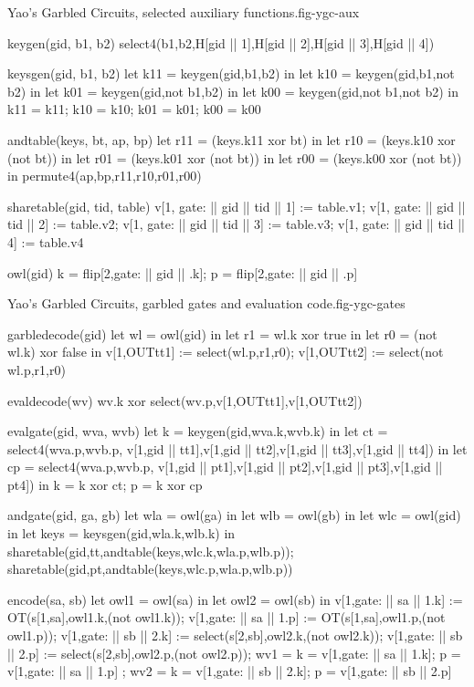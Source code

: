 \begin{fpfig}[t]{Yao's Garbled Circuits, selected auxiliary functions.}{fig-ygc-aux}
{\footnotesize
\begin{verbatimtab}
  keygen(gid, b1, b2) { select4(b1,b2,H[gid || 1],H[gid || 2],H[gid || 3],H[gid || 4]) }
  
  keysgen(gid, b1, b2)
  {
    let k11 = keygen(gid,b1,b2) in
    let k10 = keygen(gid,b1,not b2) in
    let k01 = keygen(gid,not b1,b2) in
    let k00 = keygen(gid,not b1,not b2) in
    {k11 = k11; k10 = k10; k01 = k01; k00 = k00}
  }
  
  andtable(keys, bt, ap, bp)
  {
    let r11 = (keys.k11 xor bt) in 
    let r10 = (keys.k10 xor (not bt)) in
    let r01 = (keys.k01 xor (not bt)) in
    let r00 = (keys.k00 xor (not bt)) in
    permute4(ap,bp,r11,r10,r01,r00)
  }
  
  sharetable(gid, tid, table)
  {   
    v[1, gate: || gid || tid || 1] := table.v1;
    v[1, gate: || gid || tid || 2] := table.v2;
    v[1, gate: || gid || tid || 3] := table.v3;
    v[1, gate: || gid || tid || 4] := table.v4
  }

  owl(gid) {  { k = flip[2,gate: || gid || .k]; p = flip[2,gate: || gid || .p] }  }
\end{verbatimtab}
}
\end{fpfig}

\begin{fpfig}[t]{Yao's Garbled Circuits, garbled gates and evaluation code.}{fig-ygc-gates}
{\footnotesize
\begin{verbatimtab}
  garbledecode(gid)    
  {
    let wl = owl(gid) in
    let r1 = wl.k xor true in
    let r0 = (not wl.k) xor false in
    v[1,OUTtt1] := select(wl.p,r1,r0);
    v[1,OUTtt2] := select(not wl.p,r1,r0)
  }
  
  evaldecode(wv) { wv.k xor select(wv.p,v[1,OUTtt1],v[1,OUTtt2]) }
  
  evalgate(gid, wva, wvb)  
  {
    let k = keygen(gid,wva.k,wvb.k) in
    let ct = select4(wva.p,wvb.p,
               v[1,gid || tt1],v[1,gid || tt2],v[1,gid || tt3],v[1,gid || tt4]) in
    let cp = select4(wva.p,wvb.p,
               v[1,gid || pt1],v[1,gid || pt2],v[1,gid || pt3],v[1,gid || pt4]) in
    { k = k xor ct; p = k xor cp }
  }
  
  andgate(gid, ga, gb) 
  {
    let wla = owl(ga) in
    let wlb = owl(gb) in
    let wlc = owl(gid) in
    let keys = keysgen(gid,wla.k,wlb.k) in
    sharetable(gid,tt,andtable(keys,wlc.k,wla.p,wlb.p));
    sharetable(gid,pt,andtable(keys,wlc.p,wla.p,wlb.p))
  }

  encode(sa, sb)
  {
    let owl1 = owl(sa) in
    let owl2 = owl(sb) in
    v[1,gate: || sa || 1.k] := OT(s[1,sa],owl1.k,(not owl1.k));
    v[1,gate: || sa || 1.p] := OT(s[1,sa],owl1.p,(not owl1.p));
    v[1,gate: || sb || 2.k] := select(s[2,sb],owl2.k,(not owl2.k));
    v[1,gate: || sb || 2.p] := select(s[2,sb],owl2.p,(not owl2.p));
    { wv1 = { k = v[1,gate: || sa || 1.k]; p = v[1,gate: || sa || 1.p] };
      wv2 = { k = v[1,gate: || sb || 2.k]; p = v[1,gate: || sb || 2.p] } }
  }
\end{verbatimtab}
}
\end{fpfig}

